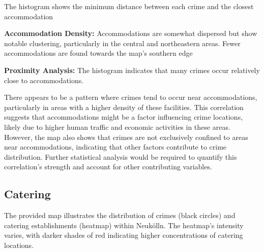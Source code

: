  The histogram shows the minimum distance between each crime and the closest accommodation

     \textbf{Accommodation Density:} Accommodations are somewhat dispersed but show notable clustering, particularly in the central and northeastern areas. Fewer accommodations are found towards the map's southern edge
     
    \textbf{Proximity Analysis:} The histogram indicates that many crimes occur relatively close to accommodations.  
   
There appears to be a pattern where crimes tend to occur near accommodations, particularly in areas with a higher density of these facilities. This correlation suggests that accommodations might be a factor influencing crime locations, likely due to higher human traffic and economic activities in these areas. However, the map also shows that crimes are not exclusively confined to areas near accommodations, indicating that other factors contribute to crime distribution. Further statistical analysis would be required to quantify this correlation's strength and account for other contributing variables. 
\subsection{Catering}
The provided map illustrates the distribution of crimes (black circles) and catering establishments (heatmap) within Neukölln. The heatmap's intensity varies, with darker shades of red indicating higher concentrations of catering locations. 

